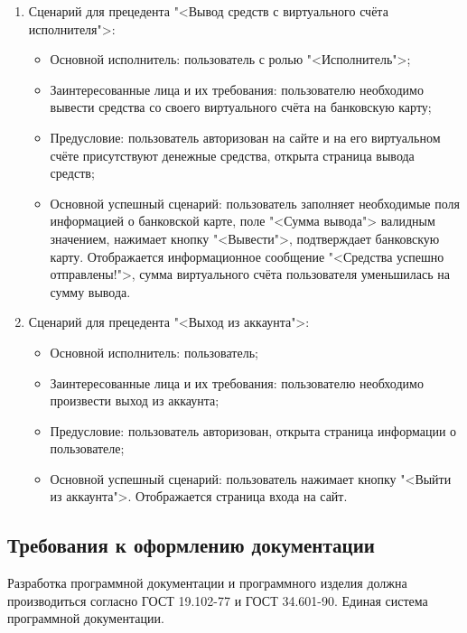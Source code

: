 \begin{enumerate}
\begin{itemize}
	\end{itemize}
\item Сценарий для прецедента "<Вывод средств с виртуального счёта исполнителя">:
	\begin{itemize}
		\item Основной исполнитель: пользователь с ролью "<Исполнитель">;
		\item Заинтересованные лица и их требования: пользователю необходимо вывести средства со своего виртуального счёта на банковскую карту;
		\item Предусловие: пользователь авторизован на сайте и на его виртуальном счёте присутствуют денежные средства, открыта страница вывода средств;
		\item Основной успешный сценарий: пользователь заполняет необходимые поля информацией о банковской карте, поле "<Сумма вывода"> валидным значением, нажимает кнопку "<Вывести">, подтверждает банковскую карту. Отображается информационное сообщение "<Средства успешно отправлены!">, сумма виртуального счёта пользователя уменьшилась на сумму вывода.
	\end{itemize}
\item Сценарий для прецедента "<Выход из аккаунта">:
	\begin{itemize}
		\item Основной исполнитель: пользователь;
		\item Заинтересованные лица и их требования: пользователю необходимо произвести выход из аккаунта;
		\item Предусловие: пользователь авторизован, открыта страница информации о пользователе;
		\item Основной успешный сценарий: пользователь нажимает кнопку "<Выйти из аккаунта">. Отображается страница входа на сайт.
	\end{itemize}
\end{enumerate}

\subsection{Требования к оформлению документации}

Разработка программной документации и программного изделия должна производиться согласно ГОСТ 19.102-77 и ГОСТ 34.601-90. Единая система программной документации.
